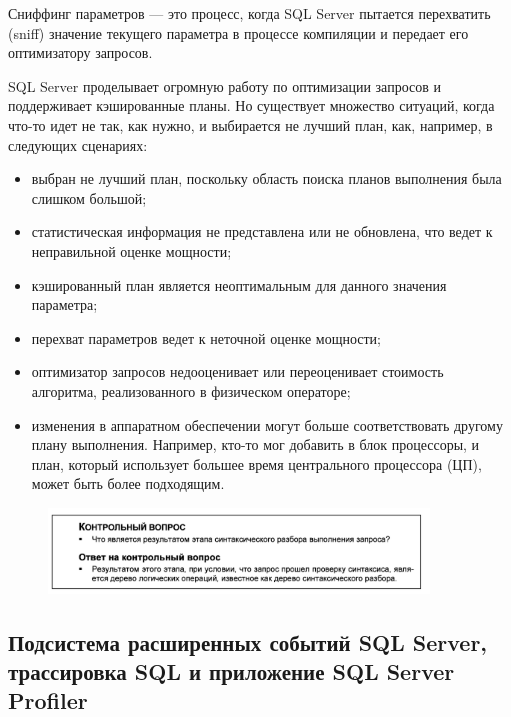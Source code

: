 Сниффинг параметров — это процесс, когда SQL Server пытается перехватить
(sniff) значение текущего параметра в процессе компиляции и передает его оптимизатору запросов.

SQL Server проделывает огромную работу по оптимизации запросов и поддерживает
кэшированные планы. Но существует множество ситуаций, когда что-то идет не так,
как нужно, и выбирается не лучший план, как, например, в следующих сценариях:

\begin{itemize}
	\item выбран не лучший план, поскольку область поиска планов выполнения была
	слишком большой; 
	\item статистическая информация не представлена или не обновлена, что ведет к неправильной оценке мощности; 
	\item кэшированный план является неоптимальным для данного значения параметра; 
	\item перехват параметров ведет к неточной оценке мощности; 
	\item оптимизатор запросов недооценивает или переоценивает стоимость алгоритма,
	реализованного в физическом операторе;
	\item изменения в аппаратном обеспечении могут больше соответствовать другому
	плану выполнения. Например, кто-то мог добавить в блок процессоры, и план,
	который использует большее время центрального процессора (ЦП), может быть
	более подходящим. 
\end{itemize}

\begin{figure}[h!]
	\begin{center}
		\includegraphics[width=0.9\textwidth]{img/zakrep33.png}
	\end{center}
	\captionsetup{justification=centering}
\end{figure}



\subsection{Подсистема расширенных событий SQL Server, трассировка SQL и приложение SQL Server Profiler}

